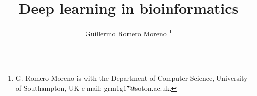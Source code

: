 \documentclass[journal]{IEEEtran}
\begin{document}
%
\title{Deep learning in bioinformatics}
%
%
%

\author{Guillermo Romero Moreno
\thanks{G. Romero Moreno is with the Department
of Computer Science, University of Southampton, UK e-mail: grm1g17@soton.ac.uk.}}

% 
%



% 

\maketitle
\end{document}
